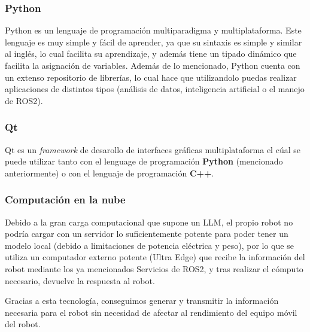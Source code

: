 \documentclass[../main.tex]{subfiles}
\begin{document}
\subsubsection{Python}
Python es un lenguaje de programación multiparadigma y multiplataforma. Este lenguaje es muy simple y fácil de aprender, ya que su 
sintaxis es simple y similar al inglés, lo cual facilita su aprendizaje, y además tiene un tipado dinámico que facilita la asignación de variables. Además de 
lo mencionado, Python cuenta con un extenso repositorio de librerías, lo cual hace que utilizandolo puedas realizar aplicaciones de distintos tipos (análisis de datos, inteligencia artificial o el
manejo de ROS2).

\subsubsection{Qt}
Qt es un \textit{framework} de desarollo de interfaces gráficas multiplataforma el cúal se puede utilizar tanto con el lenguage de programación \textbf{Python} (mencionado anteriormente) o
con el lenguaje de programación \textbf{C++}.

\subsubsection{Computación en la nube}
Debido a la gran carga computacional que supone un LLM, el propio robot no podría cargar con un servidor lo suficientemente potente para poder tener un modelo local (debido a limitaciones de potencia eléctrica y peso), por lo que se utiliza un computador externo potente (Ultra Edge) que recibe la información del robot mediante los ya mencionados Servicios de ROS2, y tras realizar el cómputo necesario, devuelve la respuesta al robot.

Gracias a esta tecnología, conseguimos generar y transmitir la información necesaria para el robot sin necesidad de afectar al rendimiento del equipo móvil del robot.
\end{document}
